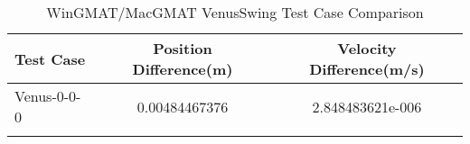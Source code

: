 \begin{table}[htbp!]
\centering
\caption{ WinGMAT/MacGMAT VenusSwing Test Case Comparison}
      \begin{tabular}{lcc}
      \hline\hline
          Test Case & Position Difference(m) & Velocity Difference(m/s) \\
         \hline
         Venus-0-0-0 & 0.00484467376 & 2.848483621e-006 \\
      \hline\hline
      \label{Table: VenusSwing WinGMAT-MacGMAT Table} 
\end{tabular}
\end{table}
